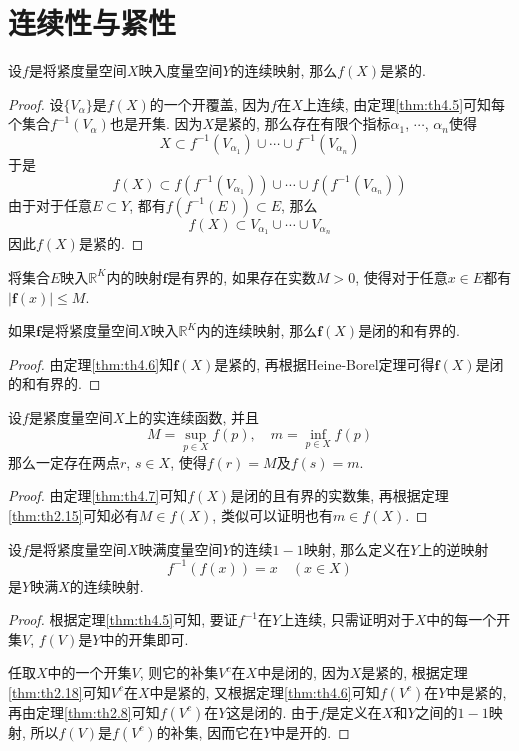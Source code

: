 \documentclass[cn,12pt,math=mtpro2,citestyle=gb7714-2015,bibstyle=gb7714-2015,twocol]{elegantbook}
\newcommand{\R}{\mathbb{R}}
\newcommand{\f}{\mathbold{f}}
\begin{document}
\section{连续性与紧性}
\begin{theorem}\label{thm:th4.6}
  设$f$是将紧度量空间$X$映入度量空间$Y$的连续映射, 那么$f(X)$是紧的.
\end{theorem}
\begin{proof}
  设$\{V_\alpha\}$是$f(X)$的一个开覆盖, 因为$f$在$X$上连续, 由定理\ref{thm:th4.5}可知每个集合$f^{-1}(V_\alpha)$也是开集. 因为$X$是紧的, 那么存在有限个指标$\alpha_1$, $\cdots$, $\alpha_n$使得
  $$X\subset f^{-1}(V_{\alpha_1})\cup\cdots\cup f^{-1}(V_{\alpha_n})$$
  于是
  $$f(X)\subset f(f^{-1}(V_{\alpha_1}))\cup\cdots\cup f(f^{-1}(V_{\alpha_n}))$$
  由于对于任意$E\subset Y$, 都有$f(f^{-1}(E))\subset E$, 那么
  $$f(X)\subset V_{\alpha_1}\cup\cdots\cup V_{\alpha_n}$$
  因此$f(X)$是紧的.


\end{proof}
\begin{definition}
将集合$E$映入$\R^K$内的映射$\f $是有界的, 如果存在实数$M>0$, 使得对于任意$x\in E$都有$|\f (x)|\leq M$.
\end{definition}
\begin{theorem}\label{thm:th4.7}
  如果$\f $是将紧度量空间$X$映入$\R^K$内的连续映射, 那么$\f (X)$是闭的和有界的.
\end{theorem}
\begin{proof}
  由定理\ref{thm:th4.6}知$\f (X)$是紧的, 再根据Heine-Borel定理可得$\f (X)$是闭的和有界的.


\end{proof}
\begin{theorem}[最值定理]\label{thm:th4.8}
 设$f$是紧度量空间$X$上的实连续函数, 并且
 $$M=\sup_{p\in X}f(p), \quad m=\inf_{p\in X}f(p)$$
 那么一定存在两点$r$, $s\in X$, 使得$f(r)=M$及$f(s)=m$.
\end{theorem}
\begin{proof}
  由定理\ref{thm:th4.7}可知$f(X)$是闭的且有界的实数集, 再根据定理\ref{thm:th2.15}可知必有$M\in f(X)$, 类似可以证明也有$m\in f(X)$.


\end{proof}
\begin{theorem}
  设$f$是将紧度量空间$X$映满度量空间$Y$的连续$1-1$映射, 那么定义在$Y$上的逆映射
  $$f^{-1}(f(x))=x\quad (x\in X)$$
  是$Y$映满$X$的连续映射.
\end{theorem}
\begin{proof}
  根据定理\ref{thm:th4.5}可知, 要证$f^{-1}$在$Y$上连续, 只需证明对于$X$中的每一个开集$V$, $f(V)$是$Y$中的开集即可.

  任取$X$中的一个开集$V$, 则它的补集$V^c$在$X$中是闭的, 因为$X$是紧的, 根据定理\ref{thm:th2.18}可知$V^c$在$X$中是紧的, 又根据定理\ref{thm:th4.6}可知$f(V^c)$在$Y$中是紧的, 再由定理\ref{thm:th2.8}可知$f(V^c)$在$Y$这是闭的. 由于$f$是定义在$X$和$Y$之间的$1-1$映射, 所以$f(V)$是$f(V^c)$的补集, 因而它在$Y$中是开的.


\end{proof}
\end{document}
